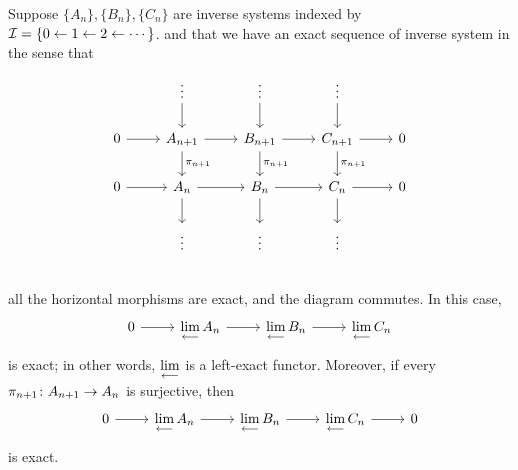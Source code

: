 \begin{proposition}\label{prop:invlim-exact}
    Suppose \(\{A_n\},\{B_n\},\{C_n\}\) are inverse systems indexed by \(\mathcal{I} = \{0 \leftarrow 1 \leftarrow 2 \leftarrow \cdots\}\).
    and that we have an exact sequence of inverse system in the sense that
    \begin{equation*}
        \begin{tikzcd}
            & \vdots \arrow{d} & \vdots \arrow{d} & \vdots \arrow{d} \\
            0 \arrow{r} & A_{n+1} \arrow{r} \arrow{d}{\pi_{n+1}} & B_{n+1} \arrow{d}{\pi_{n+1}} \arrow{r} & C_{n+1} \arrow{r} \arrow{d}{\pi_{n+1}} & 0 \\
            0 \arrow{r} & A_n \arrow{r} \arrow{d} & B_n \arrow{r} \arrow{d} & C_n \arrow{r} \arrow{d} & 0 \\
            & \vdots & \vdots & \vdots \\
        \end{tikzcd}
    \end{equation*}
    all the horizontal morphisms are exact, and the diagram commutes.
    In this case,
    \begin{equation*}
        \begin{tikzcd}
            0 \arrow{r} & \invlim A_n \arrow{r} & \invlim B_n \arrow{r} & \invlim C_n
        \end{tikzcd}
    \end{equation*}
    is exact; in other words, \(\operatorname{\displaystyle\lim_{\longleftarrow}}\) is a left-exact functor.
    Moreover, if every \(\pi_{n+1}\colon A_{n+1}\to A_n\) is surjective, then
    \begin{equation*}
        \begin{tikzcd}
            0 \arrow{r} & \invlim A_n \arrow{r} & \invlim B_n \arrow{r} & \invlim C_n \arrow{r} & 0
        \end{tikzcd}
    \end{equation*}
    is exact.
\end{proposition}
